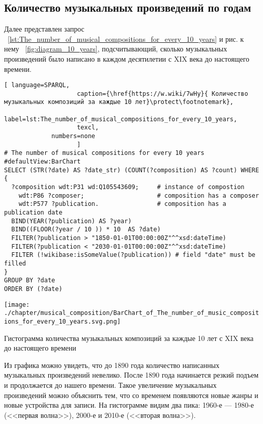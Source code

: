 \subsection{Количество музыкальных произведений по годам}
Далее представлен запрос ~\ref{lst:The_number_of_musical_compositions_for_every_10_years} и рис. к нему ~\ref{fig:diagram_10_years}, подсчитывающий, сколько музыкальных произведений было написано в каждом десятилетии с XIX века до настоящего времени.

\begin{lstlisting}[ language=SPARQL,
                    caption={\href{https://w.wiki/7wHy}{ Количество музыкальных композиций за каждые 10 лет}\protect\footnotemark},
                    label=lst:The_number_of_musical_compositions_for_every_10_years,
                    texcl,
	         numbers=none
                    ]
# The number of musical compositions for every 10 years
#defaultView:BarChart
SELECT (STR(?date) AS ?date_str) (COUNT(?composition) AS ?count) WHERE {
  ?composition wdt:P31 wd:Q105543609;     # instance of compostion
    wdt:P86 ?composer;                    # composition has a composer
    wdt:P577 ?publication.                # composition has a publication date
  BIND(YEAR(?publication) AS ?year)
  BIND((FLOOR(?year / 10 )) * 10  AS ?date)
  FILTER(?publication > "1850-01-01T00:00:00Z"^^xsd:dateTime)
  FILTER(?publication < "2030-01-01T00:00:00Z"^^xsd:dateTime) 
  FILTER (!wikibase:isSomeValue(?publication)) # field "date" must be filled
}
GROUP BY ?date
ORDER BY (?date)
\end{lstlisting}%

\begin{marginfigure}[0\baselineskip]
	\texttt{[image: ./chapter/musical\_composition/BarChart\_of\_The\_number\_of\_music\_compositions\_for\_every\_10\_years.svg.png]}
	\caption[Гистограмма количества музыкальных композиций за каждые 10 лет с XIX века до настоящего времени]{Гистограмма количества музыкальных композиций за каждые 10 лет с XIX века до настоящего времени}%
	\label{fig:diagram_10_years}%
\end{marginfigure}
Из графика можно увидеть, что до 1890 года количество написанных музыкальных произведений невелико. После 1890 года начинается резкий подъем и продолжается до нашего времени. Такое увеличение музыкальных произведений можно объяснить тем, что со временем появляются новые жанры и новые устройства для записи. На гистограмме видим два пика: 1960-е — 1980-е (<<первая волна>>), 2000-е и 2010-е (<<вторая волна>>).



